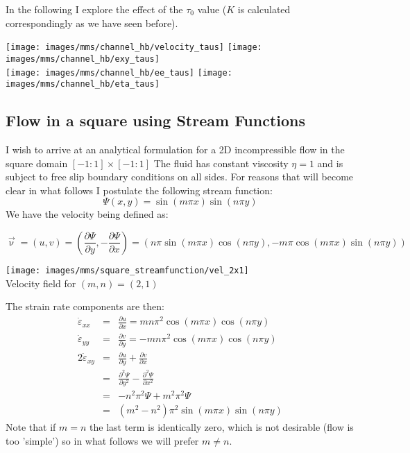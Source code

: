 In the following I explore the effect of the $\tau_0$ value ($K$ is calculated correspondingly as we have seen before).

\begin{center}
\texttt{[image: images/mms/channel\_hb/velocity\_taus]}
\texttt{[image: images/mms/channel\_hb/exy\_taus]}\\
\texttt{[image: images/mms/channel\_hb/ee\_taus]}
\texttt{[image: images/mms/channel\_hb/eta\_taus]}
\end{center}






\newpage
\subsection{Flow in a square using Stream Functions \label{ss:square_streamfct} }

I wish to arrive at an analytical formulation for a 2D incompressible flow in the square domain $[-1:1]\times[-1:1]$
The fluid has constant viscosity $\eta=1$ and is subject to free slip boundary conditions on all sides.
For reasons that will become clear in what follows I postulate the following stream function:
\begin{equation}
\Psi(x,y)=\sin( m \pi x)\sin( n\pi y)
\end{equation}
We have the velocity being defined as:
\begin{mdframed}[backgroundcolor=blue!5]
\begin{equation}
{\vec \upnu} = (u,v) = \left( \frac{\partial \Psi}{\partial y},-\frac{\partial \Psi}{\partial x} \right) 
= (n \pi \sin (m\pi x)\cos(n\pi y),-m\pi \cos(m\pi x)\sin (n\pi y))
\end{equation}
\end{mdframed}

\begin{center}
\texttt{[image: images/mms/square\_streamfunction/vel\_2x1]}\\
{\captionfont Velocity field for $(m,n)=(2,1)$}
\end{center}

The strain rate components are then:
\begin{eqnarray}
\dot\varepsilon_{xx} &=&  \frac{\partial u}{\partial x} = mn \pi^ 2  \cos (m\pi x)\cos(n\pi y)   \\
\dot\varepsilon_{yy} &=&  \frac{\partial v}{\partial y} = -mn \pi^ 2  \cos (m\pi x)\cos(n\pi y)  \\
2\dot\varepsilon_{xy} &=&  \frac{\partial u}{\partial y} +  \frac{\partial v}{\partial x}    \\
&=&  \frac{\partial^2 \Psi}{\partial y^2} -  \frac{\partial^2 \Psi}{\partial x^2}    \\
&=& -n^2\pi^2 \Psi + m^2 \pi^2 \Psi \\
&=& (m^2-n^2) \pi^2   \sin( m \pi x)\sin( n\pi y)
\end{eqnarray}
Note that if $m=n$ the last term is identically zero, which is not desirable 
(flow is too 'simple')
so in what follows we will prefer $m\neq n$.

